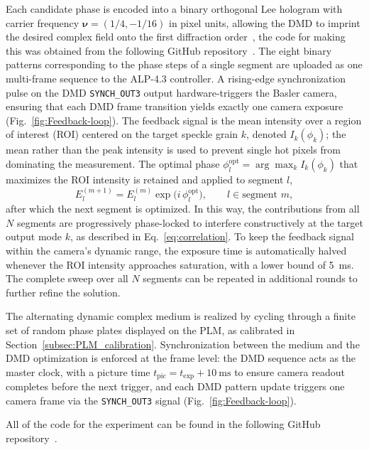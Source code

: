 \documentclass[11pt, twoside]{article}
\begin{document}
Each candidate phase is encoded into a binary orthogonal Lee hologram with carrier frequency $\boldsymbol{\nu} = (1/4, -1/16)$ in pixel units, allowing the DMD to imprint the desired complex field onto the first diffraction order~\cite{gutierrezcuevas2024binary,vialux2023alp}, the code for making this was obtained from the following GitHub repository~\cite{gutierrezcuevas2023pydmdholo}. The eight binary patterns corresponding to the phase steps of a single segment are uploaded as one multi-frame sequence to the ALP-4.3 controller. A rising-edge synchronization pulse on the DMD \texttt{SYNCH\_OUT3} output hardware-triggers the Basler camera, ensuring that each DMD frame transition yields exactly one camera exposure (Fig.~\ref{fig:Feedback-loop}). The feedback signal is the mean intensity over a region of interest (ROI) centered on the target speckle grain $k$, denoted $I_k(\phi_k)$; the mean rather than the peak intensity is used to prevent single hot pixels from dominating the measurement. The optimal phase $\phi_l^{\mathrm{opt}} = \arg\max_k I_k(\phi_k)$ that maximizes the ROI intensity is retained and applied to segment $l$,
\begin{equation}
    E_l^{(m+1)} = E_l^{(m)} \exp\!\bigl(i\,\phi_l^{\mathrm{opt}}\bigr),
    \qquad l \in \text{segment } m,
    \label{eq:phase_update}
\end{equation}
after which the next segment is optimized. In this way, the contributions from all $N$ segments are progressively phase-locked to interfere constructively at the target output mode $k$, as described in Eq.~\eqref{eq:correlation}. To keep the feedback signal within the camera's dynamic range, the exposure time is automatically halved whenever the ROI intensity approaches saturation, with a lower bound of \SI{5}{\milli\second}. The complete sweep over all $N$ segments can be repeated in additional rounds to further refine the solution.

The alternating dynamic complex medium is realized by cycling through a finite set of random phase plates displayed on the PLM, as calibrated in Section~\ref{subsec:PLM_calibration}. Synchronization between the medium and the DMD optimization is enforced at the frame level: the DMD sequence acts as the master clock, with a picture time $t_{\mathrm{pic}} = t_{\mathrm{exp}} + \SI{10}{\milli\second}$ to ensure camera readout completes before the next trigger, and each DMD pattern update triggers one camera frame via the \texttt{SYNCH\_OUT3} signal (Fig.~\ref{fig:Feedback-loop}).

All of the code for the experiment can be found in the following GitHub repository~\cite{barraza2024dmdcontroller}.
\end{document}
